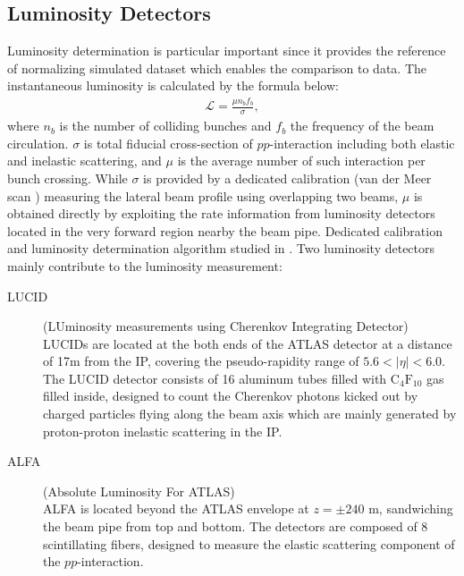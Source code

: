 \subsection{Luminosity Detectors}
Luminosity determination is particular important since it provides the reference of normalizing simulated dataset which enables the comparison to data. 
The instantaneous luminosity is calculated by the formula below:
\begin{align}
\mathcal{L} = \frac{\mu n_b f_b}{\sigma},
\end{align}
where $n_b$ is the number of colliding bunches and $f_b$ the frequency of the beam circulation.
$\sigma$ is total fiducial cross-section of $pp$-interaction including both elastic and inelastic scattering, and $\mu$ is the average number of such interaction per bunch crossing. While $\sigma$ is provided by a dedicated calibration (van der Meer scan \cite{VdMScan}) measuring the lateral beam profile using overlapping two beams, $\mu$ is obtained directly by exploiting the rate information from luminosity detectors located in the very forward region nearby the beam pipe. Dedicated calibration and luminosity determination algorithm studied in \cite{LumiMeasurement}.
Two luminosity detectors mainly contribute to the luminosity measurement:
\begin{description}

\item[LUCID] (LUminosity measurements using Cherenkov Integrating Detector) \\
LUCIDs are located at the both ends of the ATLAS detector at a distance of 17m from the IP, covering the pseudo-rapidity range of $5.6<|\eta|<6.0$.
The LUCID detector consists of 16 aluminum tubes filled with $\mathrm{C}_4 \mathrm{F}_{10}$ gas filled inside, 
designed to count the Cherenkov photons kicked out by charged particles flying along the beam axis which are mainly generated by proton-proton inelastic scattering in the IP.



\item[ALFA] (Absolute Luminosity For ATLAS) \\
ALFA is located beyond the ATLAS envelope at $z=\pm 240$ m, sandwiching the beam pipe from top and bottom.
The detectors are composed of 8 scintillating fibers, designed to measure the elastic scattering component of the $pp$-interaction. \\

\end{description}



